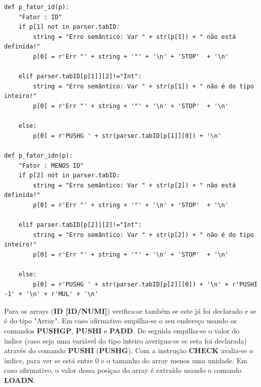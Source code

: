 \documentclass{article}
\begin{document}
\begin{lstlisting}[firstnumber=482]
def p_fator_id(p):
    "Fator : ID"
    if p[1] not in parser.tabID:
        string = "Erro semântico: Var " + str(p[1]) + " não está definida!"
        p[0] = r'Err "' + string + '"' + '\n' + 'STOP'  + '\n'

    elif parser.tabID[p[1]][2]!="Int":
        string = "Erro semântico: Var " + str(p[1]) + " não é do tipo inteiro!"
        p[0] = r'Err "' + string + '"' + '\n' + 'STOP'  + '\n'

    else:
        p[0] = r'PUSHG ' + str(parser.tabID[p[1]][0]) + '\n'

def p_fator_idn(p):
    "Fator : MENOS ID"
    if p[2] not in parser.tabID:
        string = "Erro semântico: Var " + str(p[2]) + " não está definida!"
        p[0] = r'Err "' + string + '"' + '\n' + 'STOP'  + '\n'

    elif parser.tabID[p[2]][2]!="Int":
        string = "Erro semântico: Var " + str(p[2]) + " não é do tipo inteiro!"
        p[0] = r'Err "' + string + '"' + '\n' + 'STOP'  + '\n'
    
    else:
        p[0] = r'PUSHG ' + str(parser.tabID[p[2]][0]) + '\n' + r'PUSHI -1' + '\n' + r'MUL' + '\n'
\end{lstlisting}

Para os arrays (\textbf{ID [ID/NUMI]}) verifica-se também se este já foi declarado e se é do tipo "Array". Em caso afirmativo empilha-se o seu endereço usando os comandos \textbf{PUSHGP}, \textbf{PUSHI} e \textbf{PADD}. De seguida empilha-se o valor do índice (caso seja uma variável do tipo inteiro averigua-se se esta foi declarada) através do comando \textbf{PUSHI} (\textbf{PUSHG}). Com a instrução \textbf{CHECK} avalia-se o índice, para ver se está entre 0 e o tamanho do array menos uma unidade. Em caso afirmativo, o valor dessa posiçao do array é extraído usando o comando \textbf{LOADN}.
\end{document}
